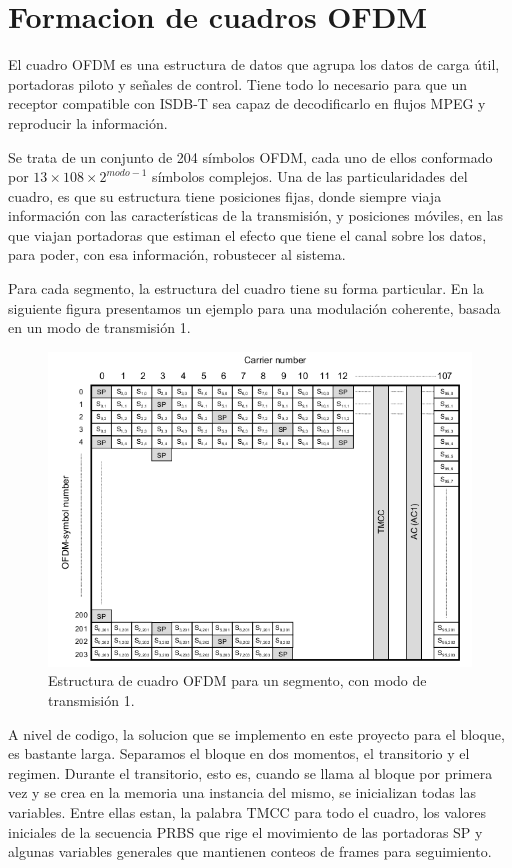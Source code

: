 \section{Formacion de cuadros OFDM}
El cuadro OFDM es una estructura de datos que agrupa los datos de carga \'util, portadoras piloto y señales de control. Tiene todo lo necesario para que un receptor compatible con ISDB-T sea capaz de decodificarlo en flujos MPEG y reproducir la informaci\'on.

Se trata de un conjunto de 204 s\'imbolos OFDM, cada uno de ellos conformado por $13 \times 108 \times 2^{modo -1}$ s\'imbolos complejos. Una de las particularidades del cuadro, es que su estructura tiene posiciones fijas, donde siempre viaja información con las características de la transmisión, y posiciones móviles, en las que viajan portadoras que estiman el efecto que tiene el canal sobre los datos, para poder, con esa información, robustecer al sistema. 

Para cada segmento, la estructura del cuadro tiene su forma particular. En la siguiente figura presentamos un ejemplo para una modulación coherente, basada en un modo de transmisión 1.

\begin{figure}[!h]
	\centering
	\includegraphics[scale=0.5]{figuras/cap05/ofdm_frame}
	\caption{\label{f:ofdm_frame} Estructura de cuadro OFDM para un segmento, con modo de transmisión 1.}
\end{figure}

A nivel de codigo, la solucion que se implemento en este proyecto para el bloque, es bastante larga. Separamos el bloque en dos momentos, el transitorio y el regimen. Durante el transitorio, esto es, cuando se llama al bloque por primera vez y se crea en la memoria una instancia del mismo, se inicializan todas las variables. Entre ellas estan, la palabra TMCC para todo el cuadro, los valores iniciales de la secuencia PRBS que rige el movimiento de las portadoras SP y algunas variables generales que mantienen conteos de frames para seguimiento.

